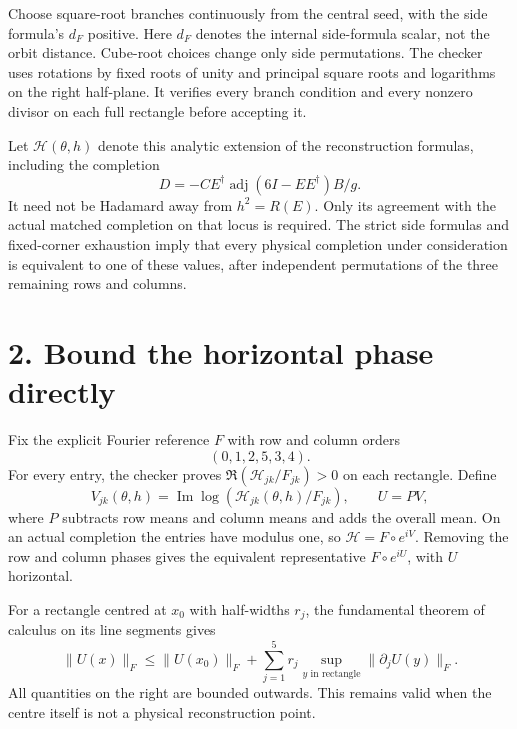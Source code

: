 \documentclass[11pt]{article}
\newcommand{\Ima}{\operatorname{Im}}
\begin{document}
Choose square-root branches continuously from the central seed, with
the side formula's $d_F$ positive. Here $d_F$ denotes the internal
side-formula scalar, not the orbit distance. Cube-root choices change
only side permutations. The checker uses rotations by fixed roots of
unity and principal square roots and logarithms on the right
half-plane. It verifies every branch condition and every nonzero
divisor on each full rectangle before accepting it.

Let $\mathcal H(\theta,h)$ denote this analytic extension of the
reconstruction formulas, including the completion
\[
 D=-CE^\dagger\operatorname{adj}(6I-EE^\dagger)B/g.
\]
It need not be Hadamard away from $h^2=R(E)$. Only its agreement with
the actual matched completion on that locus is required.
The strict side formulas and fixed-corner exhaustion imply that every
physical completion under consideration is equivalent to one of these
values, after independent permutations of the three remaining rows
and columns.

\section*{2. Bound the horizontal phase directly}
Fix the explicit Fourier reference $F$ with row and column orders
\[
 (0,1,2,5,3,4).
\]
For every entry, the checker proves
$\Re(\mathcal H_{jk}/F_{jk})>0$ on each rectangle. Define
\[
 V_{jk}(\theta,h)=\Ima\log(\mathcal H_{jk}(\theta,h)/F_{jk}),
 \qquad U=PV,
\]
where $P$ subtracts row means and column means and adds the overall
mean. On an actual completion the entries have modulus one, so
$\mathcal H=F\circ e^{iV}$. Removing the row and column phases gives
the equivalent representative $F\circ e^{iU}$, with $U$ horizontal.

For a rectangle centred at $x_0$ with half-widths $r_j$, the
fundamental theorem of calculus on its line segments gives
\begin{equation}\label{eq:bound}
 \|U(x)\|_F\le \|U(x_0)\|_F+
      \sum_{j=1}^{5}r_j\sup_{y\text{ in rectangle}}
                         \|\partial_j U(y)\|_F.
\end{equation}
All quantities on the right are bounded outwards. This remains valid
when the centre itself is not a physical reconstruction point.
\end{document}
